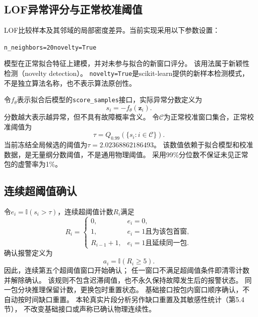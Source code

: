 \documentclass[UTF8,a4paper,12pt,fontset=fandol]{ctexart}
\newcommand{\code}[1]{\texttt{#1}}
\begin{document}
\subsection{LOF异常评分与正常校准阈值}

LOF比较样本及其邻域的局部密度差异\cite{breunig2000}。当前实现采用以下参数设置：
\begin{center}
  \code{n\_neighbors=20}\qquad \code{novelty=True}
\end{center}
模型在正常拟合特征上建模，并对未参与拟合的新窗口评分。
该用法属于新颖性检测（novelty detection）\cite{pimentel2014}。
\code{novelty=True}是scikit-learn提供的新样本检测模式，不是独立算法名称，也不表示算法原创性\cite{sklearnlof}。

令$f_{\theta}$表示拟合后模型的\code{score\_samples}接口，实际异常分数定义为
\begin{equation}
  s_i=-f_{\theta}(\mathbf{z}_i).
  \label{eq:score}
\end{equation}
分数越大表示越异常，但不具有故障概率含义。
令$\mathcal{C}$为正常校准窗口集合，正常校准阈值为
\begin{equation}
  \tau=Q_{0.99}\!\left(\{s_i:i\in\mathcal{C}\}\right).
  \label{eq:threshold}
\end{equation}
当前冻结全局候选的阈值为$\tau=2.02368862186493$。
该数值依赖于拟合模型和校准数据，是无量纲分数阈值，不是通用物理阈值。
采用99\%分位数不保证未见正常包的虚警率为1\%。

\subsection{连续超阈值确认}

令$e_i=\mathbb{I}(s_i>\tau)$，连续超阈值计数$R_i$满足
\begin{equation}
  R_i=
  \begin{cases}
    0, & e_i=0, \\
    1, & e_i=1\text{且为该包首窗}, \\
    R_{i-1}+1, & e_i=1\text{且延续同一包}.
  \end{cases}
\end{equation}
确认报警定义为
\begin{equation}
  a_i=\mathbb{I}(R_i\geq5).
  \label{eq:alarm}
\end{equation}
因此，连续第五个超阈值窗口开始确认；
任一窗口不满足超阈值条件即清零计数并解除确认。
该规则不包含迟滞阈值，也不永久保持故障发生后的报警状态。
同一包分块推理保留计数，更换包时重置状态。
基础接口按包内窗口顺序确认，不自动按时间缺口重置。
本轮真实片段分析另作缺口重置及其敏感性统计（第5.4节），
不改变基础接口或声称已确认物理连续性。
\end{document}
